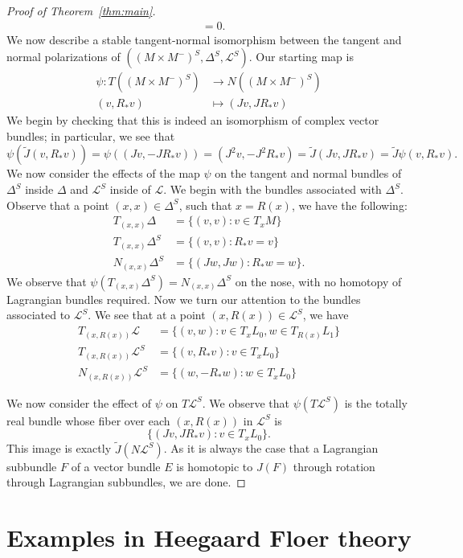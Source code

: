 \documentclass[11pt,reqno]{amsart}
\theoremstyle{definition}
\theoremstyle{remark}
\renewcommand{\tilde}{\widetilde}
\newcommand{\cL}{\mathcal{L}}
\numberwithin{equation}{section}
\begin{document}
\begin{proof}[Proof of Theorem~\ref{thm:main}]
\begin{align*}
														&=0.
\end{align*}
%
We now describe a stable tangent-normal isomorphism between the tangent and normal polarizations of $((M\times M^-)^{S}, \Delta^{S}, \cL^{S})$. Our starting map is
%
\begin{align*}
\psi: T((M \times M^-)^{S}) &\rightarrow N( (M \times M^-)^{S}) \\
		(v,R_*v) &\mapsto (Jv, JR_*v)
\end{align*} 
%
We begin by checking that this is indeed an isomorphism of complex vector bundles; in particular, we see that
%
\[ \psi(\tilde{J}(v,R_*v)) = \psi((Jv, -JR_*v)) = (J^2v, -J^2R_*v) = \widetilde{J}(Jv,JR_*v) = \widetilde{J}\psi(v,R_*v).\]
%
We now consider the effects of the map $\psi$ on the tangent and normal bundles of $\Delta^{S}$ inside $\Delta$ and $\cL^{S}$ inside of $\cL$. We begin with the bundles associated with $\Delta^{S}$. Observe that a point $(x,x) \in \Delta^{S}$, such that $x=R(x)$, we have the following:
%
\begin{align*}
T_{(x,x)}\Delta &=\{(v,v) : v \in T_xM \} \\
T_{(x,x)} \Delta^{S} &= \{(v,v) : R_*v =v \} \\
N_{(x,x)} \Delta^{S} &= \{(Jw, Jw): R_*w =w \}.
\end{align*}
%
We observe that $\psi(T_{(x,x)} \Delta^{S}) = N_{(x,x)} \Delta^{S}$ on the nose, with no homotopy of Lagrangian bundles required. Now we turn our attention to the bundles associated to $\cL^{S}$. We see that at a point $(x,R(x)) \in \cL^{S}$, we have
%
\begin{align*}
T_{(x,R(x))} \cL &= \{(v,w): v \in T_xL_0, w \in T_{R(x)}L_1 \} \\
T_{(x,R(x))} \cL^{S} &= \{(v,R_*v):  v \in T_x L_0 \} \\
N_{(x, R(x))} \cL^{S} &= \{(w, -R_*w) : w \in T_x L_0 \}
\end{align*}

We now consider the effect of $\psi$ on $T \cL^S$. We observe that $\psi(T \cL^{S})$ is the totally real bundle whose fiber over each $(x, R(x))$ in $\cL^{S}$ is 
%
\[\{(Jv, JR_*v) : v \in T_x L_0 \}. \]
%
This image is exactly $\widetilde{J}(N \cL^{S})$. As it is always the case that a Lagrangian subbundle $F$ of a vector bundle $E$ is homotopic to $J(F)$ through rotation through Lagrangian subbundles, we are done.
\end{proof}


\section{Examples in Heegaard Floer theory} \label{sec:examples}
\end{document}
